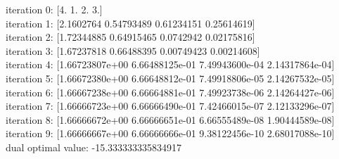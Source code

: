 \documentclass{article}
\begin{document}
\begin{enumerate}[(a)]
{			iteration 0: [4. 1. 2. 3.]\\
			iteration 1: [2.1602764  0.54793489 0.61234151 0.25614619]\\
			iteration 2: [1.72344885 0.64915465 0.0742942  0.02175816]\\
			iteration 3: [1.67237818 0.66488395 0.00749423 0.00214608]\\
			iteration 4: [1.66723807e+00 6.66488125e-01 7.49943600e-04 2.14317864e-04]\\
			iteration 5: [1.66672380e+00 6.66648812e-01 7.49918806e-05 2.14267532e-05]\\
			iteration 6: [1.66667238e+00 6.66664881e-01 7.49923738e-06 2.14264427e-06]\\
			iteration 7: [1.66666723e+00 6.66666490e-01 7.42466015e-07 2.12133296e-07]\\
			iteration 8: [1.66666672e+00 6.66666651e-01 6.66555489e-08 1.90444589e-08]\\
			iteration 9: [1.66666667e+00 6.66666666e-01 9.38122456e-10 2.68017088e-10]\\
			dual optimal value: -15.333333335834917
		}
\end{enumerate}
\end{document}
